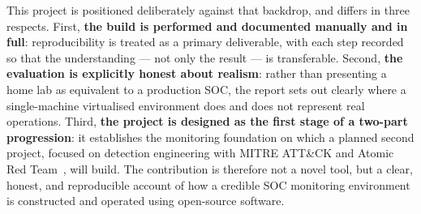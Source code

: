 This project is positioned deliberately against that backdrop, and differs in
three respects. First, \textbf{the build is performed and documented manually
and in full}: reproducibility is treated as a primary deliverable, with each
step recorded so that the understanding --- not only the result --- is
transferable. Second, \textbf{the evaluation is explicitly honest about
realism}: rather than presenting a home lab as equivalent to a production SOC,
the report sets out clearly where a single-machine virtualised environment
does and does not represent real operations. Third, \textbf{the project is
designed as the first stage of a two-part progression}: it establishes the
monitoring foundation on which a planned second project, focused on detection
engineering with MITRE ATT\&CK and Atomic Red Team~\cite{atomicredteam}, will
build. The contribution is therefore not a novel tool, but a clear,
honest, and reproducible account of how a credible SOC monitoring environment
is constructed and operated using open-source software.


